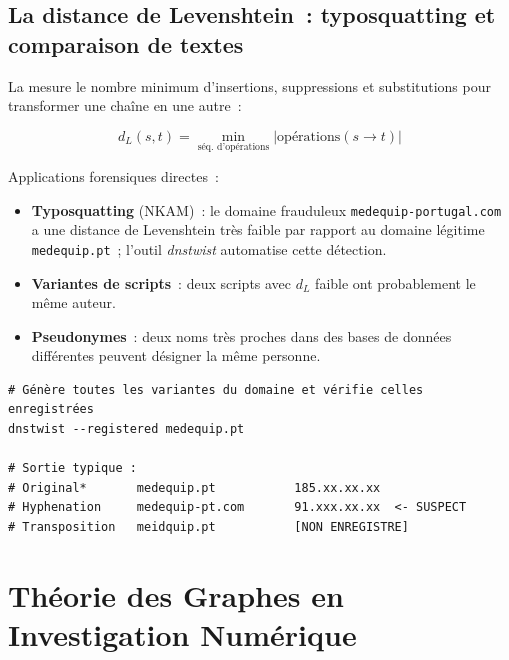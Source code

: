 \subsection{La distance de Levenshtein~: typosquatting et comparaison de textes}

La  mesure
le nombre minimum d'insertions, suppressions et substitutions pour transformer
une chaîne en une autre~:

\begin{equation}
d_L(s, t) = \min_{\text{séq. d'opérations}} |\text{opérations}(s \to t)|
\label{eq:levenshtein}
\end{equation}

Applications forensiques directes~:
\begin{itemize}
    \item \textbf{Typosquatting} (NKAM)~: le domaine frauduleux
          \texttt{medequip-portugal.com} a une distance de Levenshtein très faible
          par rapport au domaine légitime \texttt{medequip.pt}~; l'outil
          \textit{dnstwist} automatise cette détection.
    \item \textbf{Variantes de scripts}~: deux scripts avec $d_L$ faible ont
          probablement le même auteur.
    \item \textbf{Pseudonymes}~: deux noms très proches dans des bases de données
          différentes peuvent désigner la même personne.
\end{itemize}

\begin{lstlisting}[language=bash_forensique,
    caption={Détection de typosquatting avec dnstwist}]
# Génère toutes les variantes du domaine et vérifie celles enregistrées
dnstwist --registered medequip.pt

# Sortie typique :
# Original*       medequip.pt           185.xx.xx.xx
# Hyphenation     medequip-pt.com       91.xxx.xx.xx  <- SUSPECT
# Transposition   meidquip.pt           [NON ENREGISTRE]
\end{lstlisting}

\section{Théorie des Graphes en Investigation Numérique}
\label{sec:graphes}

